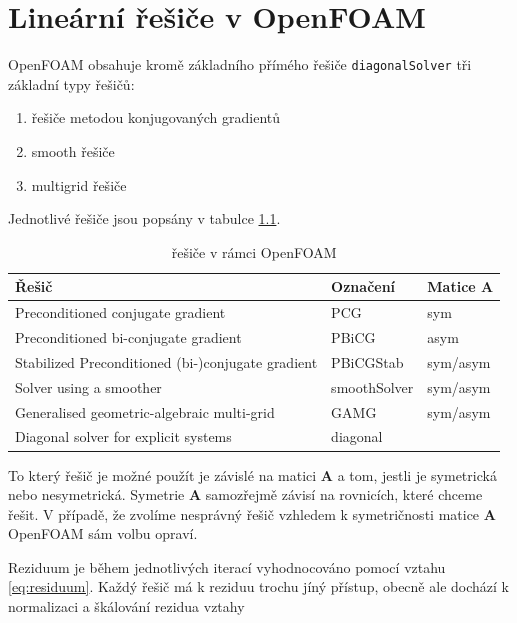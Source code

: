 \documentclass[a4paper,12pt]{report}
\theoremstyle{remark}
\begin{document}
	


	{\let\clearpage\relax \chapter{Lineární řešiče v OpenFOAM}}

OpenFOAM obsahuje kromě základního přímého řešiče \texttt{diagonalSolver} tři základní typy řešičů:
\begin{enumerate}
	\item řešiče metodou konjugovaných gradientů 
	\item smooth řešiče
	\item multigrid řešiče
\end{enumerate}

Jednotlivé řešiče jsou popsány v tabulce \ref{table:solvers}.

\begin{table}[H]
	\centering
	\caption{řešiče v rámci OpenFOAM}
	\renewcommand{\arraystretch}{1.7}
	\begin{tabular}{*3l}
		\toprule
		\textbf{Řešič} & \textbf{Označení}&\textbf{Matice $\boldsymbol{A}$}\\
		\midrule
		{\small Preconditioned conjugate gradient}& PCG& sym\\
		{\small Preconditioned bi-conjugate gradient}& PBiCG&asym \\		
		{\small Stabilized Preconditioned (bi-)conjugate gradient}& PBiCGStab&sym/asym  \\
		{\small Solver using a smoother}& smoothSolver&sym/asym \\
		{\small Generalised geometric-algebraic multi-grid}& GAMG&sym/asym  \\
		{\small Diagonal solver for explicit systems}& 	diagonal \\
	
		\bottomrule
	\end{tabular}
	
	\label{table:solvers}
\end{table}
		
To který řešič je možné použít je závislé na matici $\boldsymbol{A}$ a tom, jestli je symetrická nebo nesymetrická. Symetrie $\boldsymbol{A}$ samozřejmě závisí na rovnicích, které chceme řešit. V případě, že zvolíme nesprávný řešič vzhledem k symetričnosti matice $\boldsymbol{A}$ OpenFOAM sám volbu opraví.

Reziduum je během jednotlivých iterací vyhodnocováno pomocí vztahu \eqref{eq:residuum}. Každý řešič má k reziduu trochu jíný přístup, obecně ale dochází k normalizaci a škálování rezidua vztahy
\end{document}
